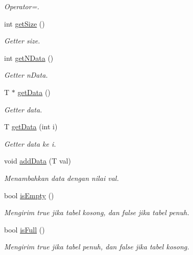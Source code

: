 \begin{DoxyCompactItemize}
\begin{DoxyCompactList}\small\item\em Operator=. \end{DoxyCompactList}\item 
int \hyperlink{classTabel_a2e90b57fa0df26e327b6beffe2efd86d}{get\-Size} ()
\begin{DoxyCompactList}\small\item\em Getter size. \end{DoxyCompactList}\item 
int \hyperlink{classTabel_a3721b452a44b1676160d4221a316b7cd}{get\-N\-Data} ()
\begin{DoxyCompactList}\small\item\em Getter n\-Data. \end{DoxyCompactList}\item 
T $\ast$ \hyperlink{classTabel_a8a3bf2f934e7900f853ba297dfd3d283}{get\-Data} ()
\begin{DoxyCompactList}\small\item\em Getter data. \end{DoxyCompactList}\item 
T \hyperlink{classTabel_adb33247e264117132197ae75d6f7a890}{get\-Data} (int i)
\begin{DoxyCompactList}\small\item\em Getter data ke i. \end{DoxyCompactList}\item 
void \hyperlink{classTabel_a37f51cda12148242f518f8d769bb0497}{add\-Data} (T val)
\begin{DoxyCompactList}\small\item\em Menambahkan data dengan nilai val. \end{DoxyCompactList}\item 
\hypertarget{classTabel_aeff60e399725d65b166a6cf9af9a251a}{bool \hyperlink{classTabel_aeff60e399725d65b166a6cf9af9a251a}{is\-Empty} ()}\label{classTabel_aeff60e399725d65b166a6cf9af9a251a}

\begin{DoxyCompactList}\small\item\em Mengirim true jika tabel kosong, dan false jika tabel penuh. \end{DoxyCompactList}\item 
\hypertarget{classTabel_aea00a38e162729dabd60089eeb0d16fd}{bool \hyperlink{classTabel_aea00a38e162729dabd60089eeb0d16fd}{is\-Full} ()}\label{classTabel_aea00a38e162729dabd60089eeb0d16fd}

\begin{DoxyCompactList}\small\item\em Mengirim true jika tabel penuh, dan false jika tabel kosong. \end{DoxyCompactList}\end{DoxyCompactItemize}


